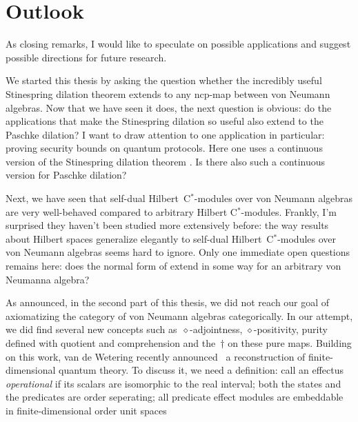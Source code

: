 \documentclass[b]{subfiles}
\begin{document}
\chapter{Outlook}
\begin{parsec}%
\begin{point}%
As closing remarks, I would like to speculate
    on possible applications
    and suggest possible
        directions for future research.

We started this thesis by asking the question
    whether the incredibly useful Stinespring dilation theorem
    extends to any ncp-map between von Neumann algebras.
Now that we have seen it does, the next question is obvious:
    do the applications that make the Stinespring dilation so useful
    also extend to the Paschke dilation?
I want to draw attention to one application in particular:
    proving security bounds on quantum protocols.
Here one uses a continuous version
    of the Stinespring dilation theorem \cite{werner2}.
Is there also such a continuous version for Paschke dilation?
\begin{point}%
Next, we have seen that self-dual Hilbert~C$^*$-modules
    over von Neumann algebras
    are very well-behaved compared
    to arbitrary Hilbert C$^*$-modules.
    Frankly, I'm surprised they haven't been studied
        more extensively before:
        the way results about Hilbert spaces
        generalize elegantly to self-dual Hilbert~C$^*$-modules
        over von Neumann algebras seems hard to ignore.
Only one immediate open questions remains here:
    does the normal form of 
    extend in some way for an arbitrary von Neumanna algebra?
\end{point}
\begin{point}%
As announced, in the second part of this thesis, we did not reach
    our goal of axiomatizing the category of von Neumann algebras
    categorically.
In our attempt, we did find several new concepts
    such as~$\diamond$-adjointness, $\diamond$-positivity,
        purity defined with quotient and comprehension and
        the~$\dagger$ on these pure maps.
Building on this work,
    van de Wetering recently announced~\cite{wetering}
    a reconstruction of finite-dimensional quantum theory.
    To discuss it, we need a definition: call an effectus \emph{operational}
        if its scalars are isomorphic to the real interval;
        both the states and the predicates are order seperating;
        all predicate effect modules are embeddable in
        finite-dimensional order unit spaces

\end{point}
\end{point}
\end{parsec}
\end{document}
